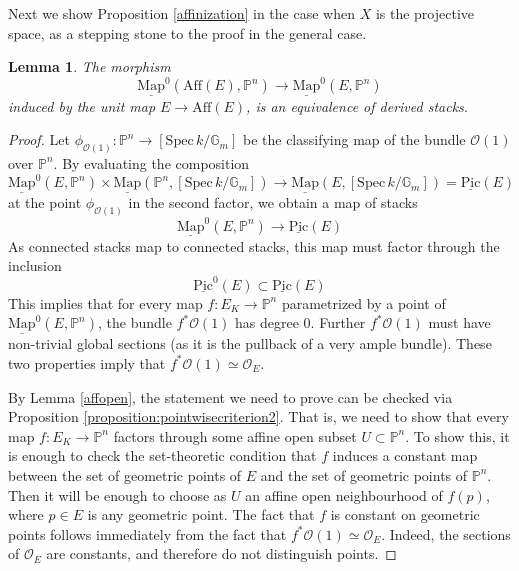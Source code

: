 \documentclass[11pt,letterpaper]{amsart}
\newtheorem{lemma}[dummy]{Lemma}
\newcommand{\bG}{\mathbb{G}}
\newcommand{\bP}{\mathbb{P}}
\newcommand{\cO}{\mathcal{O}}
\newcommand{\Map}[2]{\underline{\mathrm{Map}}\left (#1,#2\right )}
\newcommand{\Mapo}[2]{\underline{\mathrm{Map}}^{0}\left (#1,#2\right )}
\newcommand{\Spec}{\mathrm{S}\mathrm{pec}\,}
\begin{document}
 Next we show Proposition \ref{affinization} in the case when $X$ is the projective space, as a stepping stone to the proof in the general case.
 \begin{lemma}
 \label{Pn}
 The morphism 
$$
\Mapo{\mathrm{Aff}(E)}{\bP^n} \to \Mapo{E}{\bP^n}
$$
 induced by the unit map $E \to \mathrm{Aff}(E)$, is an equivalence of derived stacks.
 \end{lemma}
 \begin{proof}
Let $\phi_{\cO(1)}: \mathbb{P}^n \to [\Spec k/\bG_m]$ be the classifying map of the bundle $\cO(1)$ over $\mathbb{P}^n$. By evaluating the composition 
  $$
  \Mapo{E}{\bP^n} \times \Map{\bP^n}{[\Spec k/\bG_m]} \longrightarrow \Map{E}{[\Spec k/\bG_m]} = \underline{\mathrm{Pic}}(E)
  $$
  at the point $\phi_{\cO(1)}$ in the second factor, we obtain a map of stacks 
$$
\Mapo{E}{\bP^n} \to \underline{\mathrm{Pic}}(E)
$$
As connected stacks map to connected stacks, this map must factor through the inclusion $$\underline{\mathrm{Pic}}^0(E) \subset \underline{\mathrm{Pic}}(E)$$This implies that for every map $f: E_{K} \to \bP^n$ parametrized by a point of 
$
\Mapo{E}{\bP^n}$, the bundle $f^*\cO(1)$ has degree 0. Further $f^*\cO(1)$ must have non-trivial global sections (as it is the pullback of a very ample bundle). These two properties imply that $f^*\cO(1) \simeq \cO_E$. 

By Lemma \ref{affopen}, the statement we need to prove can be checked via Proposition \ref{proposition:pointwisecriterion2}. That is, we need to show that every map $f:E_{K} \to \mathbb{P}^n$ factors through some affine open subset $U \subset \mathbb{P}^n$. To show this, it is enough to check the set-theoretic condition that $f$ induces a constant map between the set of geometric points of $E$ and the set of geometric points of $\mathbb{P}^n$. Then it will be enough to choose as $U$ an affine open neighbourhood of $f(p)$, where $p \in E$ is any geometric point. The fact that $f$ is constant on geometric points follows immediately from the  fact that  $f^*\cO(1) \simeq \cO_E$. Indeed, the sections of  $\cO_E$ are constants, and therefore do not distinguish points. 
\end{proof}
  
\end{document}
